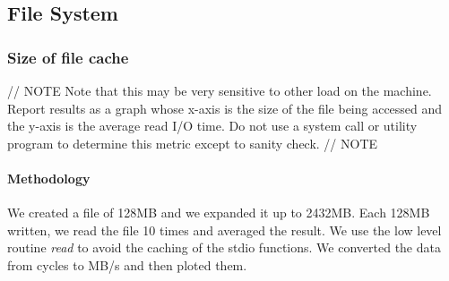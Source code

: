 \newpage
\subsection{File System}

\subsubsection{Size of file cache}

// NOTE
Note that this may be very sensitive to other load on the machine. Report results as a graph whose x-axis is the size of the file being accessed and the y-axis is the average read I/O time. Do not use a system call or utility program to determine this metric except to sanity check.
// NOTE
%
%



\paragraph{Methodology}
We created a file of 128MB and we expanded it up to 2432MB.
Each 128MB written, we read the file 10 times and averaged the result.
We use the low level routine \emph{read} to avoid the caching of the stdio
functions.
We converted the data from cycles to MB/s and then ploted them.

